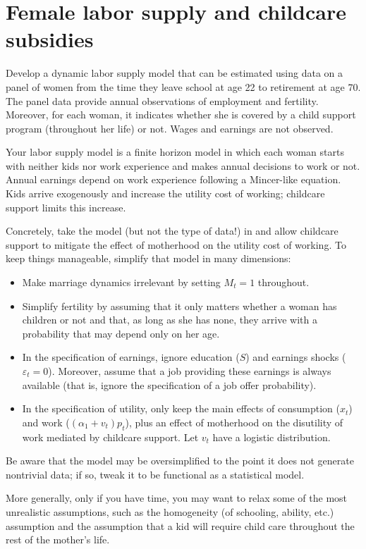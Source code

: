 \documentclass[fleqn,12pt]{article}
\theoremstyle{plain}
\theoremstyle{definition}
\begin{document}
\section*{Female labor supply and childcare subsidies}

Develop a dynamic labor supply model that can be estimated using data on a panel of women from the time they leave school at age 22 to retirement at age 70. The panel data provide annual observations of employment and fertility. Moreover, for each woman, it indicates whether she is covered by a child support program (throughout her life) or not. Wages and earnings are not observed. 

Your labor supply model is a finite horizon model in which each woman starts with neither kids nor work experience and makes annual decisions to work or not. Annual earnings depend on work experience following a Mincer-like equation. Kids arrive exogenously and increase the utility cost of working; childcare support limits this increase. 

Concretely, take the model (but not the type of data!) in \citet[][Section 3]{https://doi.org/10.3982/ECTA8803} and allow childcare support to mitigate the effect of motherhood on the utility cost of working. To keep things manageable, simplify that model in many dimensions:
\begin{itemize}
\item Make marriage dynamics irrelevant by setting  $M_t=1$ throughout.
\item Simplify fertility by assuming that it only matters whether a woman has children or not and that, as long as she has none, they arrive with a probability that may depend only on her age. 
\item In the specification of earnings, ignore education ($S$) and earnings shocks ($\varepsilon_t=0$). Moreover, assume that a job providing these earnings is always available (that is, ignore the specification of a job offer probability).
\item In the specification of utility, only keep the main effects of consumption ($x_t$) and work ($(\alpha_1+v_t)p_t$), plus an effect of motherhood on the disutility of work mediated by childcare support. Let  $v_t$ have a logistic distribution.
\end{itemize}
Be aware that the model may be oversimplified to the point it does not generate nontrivial data; if so, tweak it to be functional as a statistical model. 

More generally, only if you have time, you may want to relax some of the most unrealistic assumptions, such as the homogeneity (of schooling, ability, etc.) assumption and the assumption that a kid will require child care throughout the rest of the mother's life. 
\end{document}
